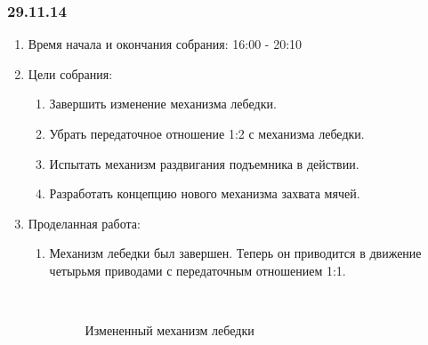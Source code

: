 \subsubsection{29.11.14}

\begin{enumerate}
	\item Время начала и окончания собрания:
	16:00 - 20:10
	\item Цели собрания:
	\begin{enumerate}
		\item Завершить изменение механизма лебедки.
		
		\item Убрать передаточное отношение 1:2 с механизма лебедки.
		
		\item Испытать механизм раздвигания подъемника в действии.
		
		\item Разработать концепцию нового механизма захвата мячей.
		
	\end{enumerate}
	\item Проделанная работа:
	\begin{enumerate}
		\item Механизм лебедки был завершен. Теперь он приводится в движение четырьмя приводами с передаточным отношением 1:1.
		
		\begin{figure}[H]
			\begin{minipage}[h]{0.2\linewidth}
				\center  
			\end{minipage}
			\begin{minipage}[h]{0.6\linewidth}
				\caption{Измененный механизм лебедки}
			\end{minipage}
		\end{figure}
		

\end{enumerate}
\end{enumerate}
